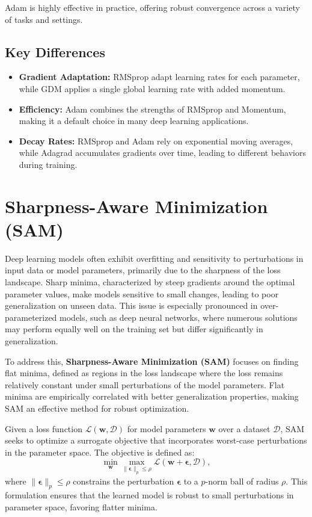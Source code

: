 \documentclass{article}
\begin{document}
Adam is highly effective in practice, offering robust convergence across a variety of tasks and settings.

\subsection{Key Differences}
\begin{itemize}
    \item \textbf{Gradient Adaptation:} RMSprop adapt learning rates for each parameter,
    while GDM applies a single global learning rate with added momentum.
    \item \textbf{Efficiency:} Adam combines the strengths of RMSprop and Momentum, making it a default choice in many deep learning applications.
    \item \textbf{Decay Rates:} RMSprop and Adam rely on exponential moving averages, while Adagrad accumulates gradients over time, leading to different behaviors during training.
\end{itemize}

\section{Sharpness-Aware Minimization (SAM)}

Deep learning models often exhibit overfitting and sensitivity to perturbations in input data or model parameters, primarily due to the sharpness of the loss landscape. Sharp minima, characterized by steep gradients around the optimal parameter values, make models sensitive to small changes, leading to poor generalization on unseen data. This issue is especially pronounced in over-parameterized models, such as deep neural networks, where numerous solutions may perform equally well on the training set but differ significantly in generalization.

To address this, \textbf{Sharpness-Aware Minimization (SAM)} focuses on finding flat minima, defined as regions in the loss landscape where the loss remains relatively constant under small perturbations of the model parameters. Flat minima are empirically correlated with better generalization properties, making SAM an effective method for robust optimization.

Given a loss function $\mathcal{L}(\mathbf{w}, \mathcal{D})$ for model parameters $\mathbf{w}$ over a dataset $\mathcal{D}$, SAM seeks to optimize a surrogate objective that incorporates worst-case perturbations in the parameter space. The objective is defined as:
\[
\min_{\mathbf{w}} \max_{\|\boldsymbol{\epsilon}\|_p \leq \rho} \mathcal{L}(\mathbf{w} + \boldsymbol{\epsilon}, \mathcal{D}),
\]
where $\|\boldsymbol{\epsilon}\|_p \leq \rho$ constrains the perturbation $\boldsymbol{\epsilon}$ to a $p$-norm ball of radius $\rho$. This formulation ensures that the learned model is robust to small perturbations in parameter space, favoring flatter minima.
\end{document}
